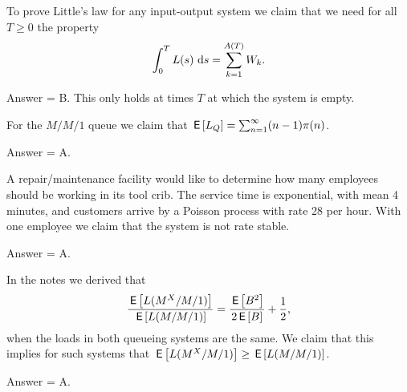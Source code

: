 \begin{exercise}[201807]
To prove Little's law for any input-output system we claim that we need for all $T\geq 0$ the property 
\begin{equation*}
 \int_0^T L(s)\, \,\text{d}s = \sum_{k=1}^{A(T)} W_k.
\end{equation*}
\begin{solution}
Answer = B. This only holds at times $T$ at which the system is empty.
\end{solution}
\end{exercise}

\begin{exercise}[201807]
For the $M/M/1$ queue we claim that $\,\mathsf{E}\left[L_Q\right] = \sum_{n=1}^\infty (n-1)\pi(n)$.
\begin{solution}
Answer = A.
\end{solution}
\end{exercise}

\begin{exercise}[201807]
 A repair/maintenance facility would like to determine
 how many employees should be working in its tool crib. The service
 time is exponential, with mean 4 minutes, and customers arrive by a
 Poisson process with rate 28 per hour. With one employee we claim that the system is not rate stable.
\begin{solution}
Answer = A.
\end{solution}
\end{exercise}

\begin{exercise}[201807]
 In the notes we derived that
 \begin{equation*}
 \frac{\,\mathsf{E}\left[L(M^X/M/1)\right]}{\,\mathsf{E}\left[L(M/M/1)\right]} = \frac{\,\mathsf{E}\left[B^2\right]}{2\,\mathsf{E}\left[B\right]} + \frac 12,
 \end{equation*}
when the loads in both queueing systems are the same. We claim that this implies for such systems that
$\,\mathsf{E}\left[L(M^X/M/1)\right]\geq \,\mathsf{E}\left[L(M/M/1)\right]$.
\begin{solution}
Answer = A.
\end{solution}
\end{exercise}


